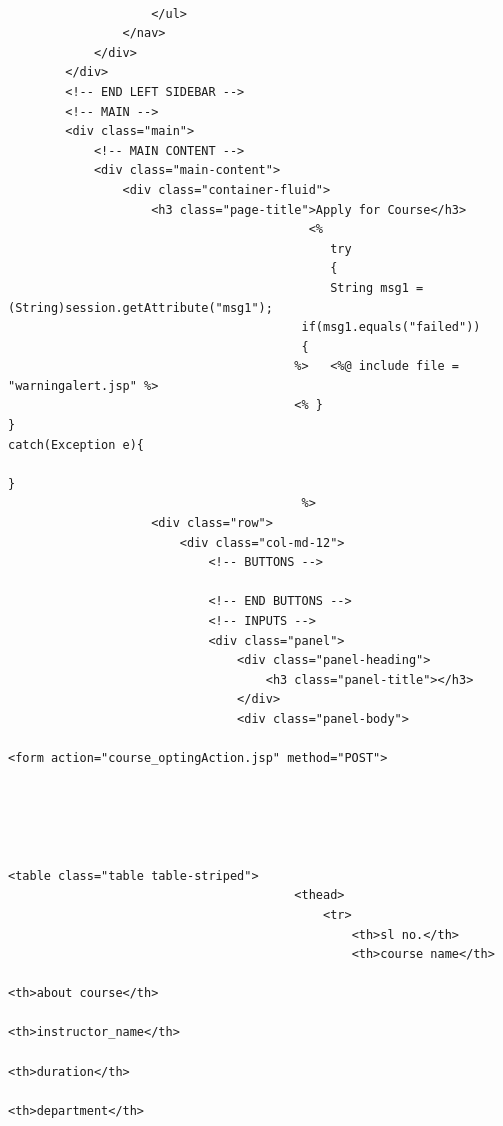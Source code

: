 \begin{verbatim}
				
					</ul>
				</nav>
			</div>
		</div>
		<!-- END LEFT SIDEBAR -->
		<!-- MAIN -->
		<div class="main">
			<!-- MAIN CONTENT -->
			<div class="main-content">
				<div class="container-fluid">
					<h3 class="page-title">Apply for Course</h3>
                                          <% 
                                             try
                                             {
                                             String msg1 = (String)session.getAttribute("msg1");
                                         if(msg1.equals("failed"))
                                         {
                                        %>   <%@ include file = "warningalert.jsp" %>
                                        <% }
}
catch(Exception e){

}
                                         %>
					<div class="row">
						<div class="col-md-12">
							<!-- BUTTONS -->
							
							<!-- END BUTTONS -->
							<!-- INPUTS -->
							<div class="panel">
								<div class="panel-heading">
									<h3 class="panel-title"></h3>
								</div>
								<div class="panel-body">
                                                                   <form action="course_optingAction.jsp" method="POST">
                                                                                
                                                                                
                                                                                
                                                                                
                                                                           <table class="table table-striped">
										<thead>
											<tr>
												<th>sl no.</th>
												<th>course name</th>
                                                                                                <th>about course</th>
                                                                                                 <th>instructor_name</th>
                                                                                                  <th>duration</th>
                                                                                                   <th>department</th>
                                                                                                

\end{verbatim}
